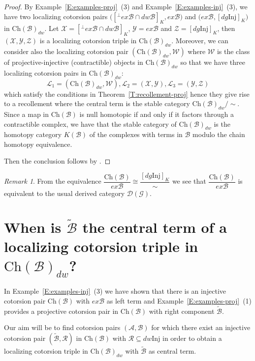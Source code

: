 \documentclass[11pt,a4paper,reqno]{amsart}
\newcommand{\A}{\mathcal{A}}
\newcommand{\B}{\mathcal{B}}
\newcommand{\D}{\mathcal{D}}
\newcommand{\G}{\mathcal{G}}
\newcommand{\clL}{\mathcal{L}}
\newcommand{\R}{\mathcal{R}}
\newcommand{\X}{\mathcal{X}}
\newcommand{\Y}{\mathcal{Y}}
\newcommand{\W}{\mathcal{W}}
\newcommand{\Z}{\mathcal{Z}}
\newcommand{\Ch}{\mathrm{Ch}}
\newcommand{\Inj}{\mathrm{Inj}}
\theoremstyle{plain}
\theoremstyle{definition}
\theoremstyle{remark}
\newtheorem{rem}[thm]{Remark}
\begin{document}
%
\begin{proof} By Example~\ref{E:examples-proj}~(3)  and Example~\ref{E:examples-inj}~(3), we have two localizing cotorsion pairs $\Big([{}^\perp{} ex\B\cap dw \B]_K, ex\B\Big)$ and $\Big(ex\B,  [dg \Inj]_K\Big)$ in $\Ch(\B)_{dw}$. Let $\X=[{}^\perp{} ex\B\cap dw \B]_K$, $\Y=ex\B$ and $\Z=[dg \Inj]_K$, then $(\X, \Y, \Z)$ is a localizing cotorsion triple in $\Ch(\B)_{dw}$. Moreover, we can consider also the localizing cotorsion pair $(\Ch(\B)_{dw}, \W)$ where $\W$ is the class of projective-injective (contractible) objects in $\Ch(\B)_{dw}$ so that we have three localizing cotorsion pairs in $\Ch(\B)_{dw}$:
\[\clL_1=(\Ch(\B)_{dw}, \W), \clL_2=(\X, \Y), \clL_3=(\Y, \Z)\]
which satisfy the conditions in Theorem~\ref{T:recollement-proj} hence they give rise to a recollement where the central term is the stable category $\Ch(\B)_{dw}/\sim$. Since a map in $\Ch(\B)$ is null homotopic if and only if it factors through a contractible complex, we have that the stable category of $\Ch(\B)_{dw}$ is  the homotopy category $K(\B)$ of the complexes with terms in $\B$ modulo the chain homotopy equivalence.
%
%

Then the conclusion follows by  \cite[Corollary 4.5]{G7} .
\end{proof}


\begin{rem}\label{R:derived-of-R} From the equivalence $\dfrac{\Ch(\B)}{ex\B} \cong \dfrac{ [dg \Inj]_K}{\sim}$ we see that  $\dfrac{\Ch(\B)}{ex\B}$  is equivalent to the usual derived category $\D(\G)$.
\end{rem}

\section{When is $\tilde{\B}$ the central term of a localizing cotorsion triple in $\Ch(\B)_{dw}$?}\label{S:tildeB}


%
In Example~\ref{E:examples-inj}~(3) we have shown that there is an injective cotorsion pair $\Ch(\B)$ with $ex\B$
 as left term and Example~\ref{E:examples-proj}~(1) provides a projective cotorsion pair in $\Ch(\B)$ with right component $ \widetilde{\B}$.

 Our aim will be to find cotorsion pairs $(\A, \B)$ for which there exist an injective cotorsion pair $(\widetilde{\B}, \R)$ in $\Ch(\B)$ with $
\R\subseteq dw\Inj$ in order to obtain a localizing cotorsion triple in $\Ch(\B)_{dw}$ with $\widetilde{\B}$ as central term.
\end{document}
